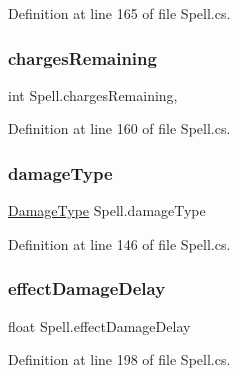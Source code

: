 Definition at line 165 of file Spell.\+cs.

\mbox{\label{class_spell_a8d79659cf4a135d0f8e859e07c695df9}} 
\subsubsection{\texorpdfstring{chargesRemaining}{chargesRemaining}}
{\footnotesize\ttfamily int Spell.\+charges\+Remaining\hspace{0.3cm}{\ttfamily [get]}, {\ttfamily [set]}}



Definition at line 160 of file Spell.\+cs.

\mbox{\label{class_spell_ac71023a2630008b8f2e428caf7cc9251}} 
\subsubsection{\texorpdfstring{damageType}{damageType}}
{\footnotesize\ttfamily \mbox{\hyperlink{class_spell_a3e228beaf92e2c035e6599aaf0ac2d2a}{Damage\+Type}} Spell.\+damage\+Type\hspace{0.3cm}{\ttfamily [get]}}



Definition at line 146 of file Spell.\+cs.

\mbox{\label{class_spell_a7f6820ee9c92e780cc1938addd9e6793}} 
\subsubsection{\texorpdfstring{effectDamageDelay}{effectDamageDelay}}
{\footnotesize\ttfamily float Spell.\+effect\+Damage\+Delay\hspace{0.3cm}{\ttfamily [get]}}



Definition at line 198 of file Spell.\+cs.

\mbox{\label{class_spell_a05deca8c2c600bb4d7c06df0b0d4df41}} 
